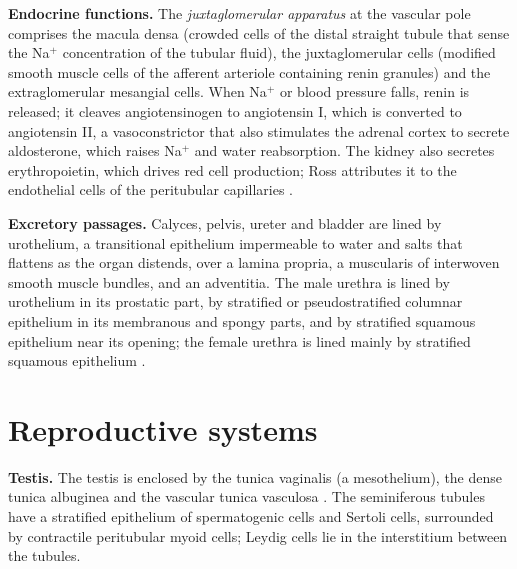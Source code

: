 \textbf{Endocrine functions.} The
\emph{juxtaglomerular apparatus} at the
vascular pole comprises the macula densa
(crowded cells of the distal straight tubule
that sense the Na$^+$ concentration of the
tubular fluid), the juxtaglomerular cells
(modified smooth muscle cells of the afferent
arteriole containing renin granules) and the
extraglomerular mesangial cells. When Na$^+$
or blood pressure falls, renin is released;
it cleaves angiotensinogen to angiotensin I,
which is converted to angiotensin II, a
vasoconstrictor that also stimulates the
adrenal cortex to secrete aldosterone, which
raises Na$^+$ and water reabsorption. The
kidney also secretes erythropoietin, which
drives red cell production; Ross attributes
it to the endothelial cells of the
peritubular capillaries \cite[Chapter
20]{ross2011histology}.

\textbf{Excretory passages.} Calyces, pelvis,
ureter and bladder are lined by urothelium, a
transitional epithelium impermeable to water
and salts that flattens as the organ
distends, over a lamina propria, a muscularis
of interwoven smooth muscle bundles, and an
adventitia. The male urethra is lined by
urothelium in its prostatic part, by
stratified or pseudostratified columnar
epithelium in its membranous and spongy
parts, and by stratified squamous epithelium
near its opening; the female urethra is lined
mainly by stratified squamous epithelium
\cite[Chapter 20]{ross2011histology}.

\section{Reproductive systems}
\label{section-reproductive}

\textbf{Testis.} The testis is enclosed by
the tunica vaginalis (a mesothelium), the
dense tunica albuginea and the vascular
tunica vasculosa \cite[Chapter
22]{ross2011histology}. The seminiferous
tubules have a stratified epithelium of
spermatogenic cells and Sertoli cells,
surrounded by contractile peritubular myoid
cells; Leydig cells lie in the interstitium
between the tubules.

